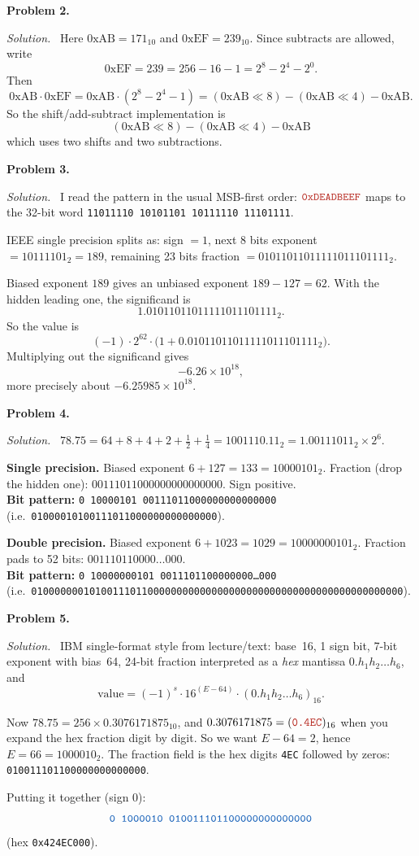 \documentclass[12pt]{article}
\newcommand{\problem}[1]{\vspace{0.8em}\noindent\textbf{Problem #1.}\vspace{0.35em}}
\newenvironment{solution}{\par\noindent\textit{Solution.}\ }{\par\vspace{1.1em}}
\newcommand{\bits}[1]{\texttt{\textcolor{NavyBlue}{#1}}}
\newcommand{\hexv}[1]{\texttt{\textcolor{BrickRed}{#1}}}
\begin{document}
\problem{2}
\begin{solution}
Here $0\text{xAB}=171_{10}$ and $0\text{xEF}=239_{10}$. Since subtracts are allowed, write
\[
0\text{xEF}=239=256-16-1=2^8-2^4-2^0.
\]
Then
\[
0\text{xAB}\cdot 0\text{xEF}
=0\text{xAB}\cdot(2^8-2^4-1)
=(0\text{xAB}\ll 8)-(0\text{xAB}\ll 4)-0\text{xAB}.
\]
So the shift/add-subtract implementation is
\[
\boxed{(0\text{xAB}\ll 8)-(0\text{xAB}\ll 4)-0\text{xAB}}
\]
which uses two shifts and two subtractions.
\end{solution}

\problem{3}
\begin{solution}
I read the pattern in the usual MSB-first order: $\hexv{0xDEADBEEF}$ maps to the 32-bit word
\bits{11011110\,10101101\,10111110\,11101111}.

IEEE single precision splits as: sign $=1$, next 8 bits exponent $=10111101_2 = 189$, remaining 23 bits fraction $=01011011011111011101111_2$.

Biased exponent $189$ gives an unbiased exponent $189-127=62$. With the hidden leading one, the significand is
\[
1.01011011011111011101111_2.
\]
So the value is
\[
(-1)\cdot 2^{62}\cdot\bigl(1 + 0.01011011011111011101111_2\bigr).
\]
Multiplying out the significand gives
\[
-6.26\times 10^{18},
\]
more precisely about $-6.25985\times 10^{18}$.
\end{solution}

\problem{4}
\begin{solution}
$78.75 = 64 + 8 + 4 + 2 + \tfrac12 + \tfrac14 = 1001110.11_2 = 1.00111011_2\times 2^{6}$.

\textbf{Single precision.} Biased exponent $6+127=133=10000101_2$. Fraction (drop the hidden one): $00111011000000000000000$. Sign positive. \\
\textbf{Bit pattern:} \bits{0 10000101 00111011000000000000000} \\
(i.e.\ \bits{01000010100111011000000000000000}).

\textbf{Double precision.} Biased exponent $6+1023=1029=10000000101_2$. Fraction pads to 52 bits: $001110110000\ldots000$. \\
\textbf{Bit pattern:} \bits{0 10000000101 0011101100000000\ldots000} \\
(i.e.\ \bits{0100000001010011101100000000000000000000000000000000000000000000}).
\end{solution}

\problem{5}
\begin{solution}
IBM single-format style from lecture/text: base~16, 1 sign bit, 7-bit exponent with bias~64, 24-bit fraction interpreted as a \emph{hex} mantissa $0.h_1h_2\ldots h_6$, and
\[
\text{value} = (-1)^s \cdot 16^{(E-64)}\cdot (0.h_1h_2\ldots h_6)_{16}.
\]

Now $78.75 = 256 \times 0.3076171875_{10}$, and $0.3076171875 = (\hexv{0.4EC})_{16}$ when you expand the hex fraction digit by digit. So we want $E-64=2$, hence $E=66=1000010_2$. The fraction field is the hex digits \hexv{4EC} followed by zeros: \bits{010011101100000000000000}.

Putting it together (sign $0$):
\[
\textbf{\bits{0\ 1000010\ 010011101100000000000000}}
\]
(hex \hexv{0x424EC000}).
\end{solution}
\end{document}
